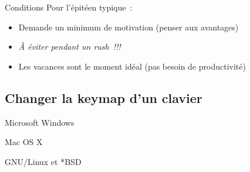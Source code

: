 \begin{frame}{Conditions}
    Pour l’épitéen typique~:
    \begin{itemize}
        \item Demande un minimum de motivation (penser aux avantages) \pause

        \item \emph{À éviter pendant un rush~!!!} \pause

        \item Les vacances sont le moment idéal (pas besoin de productivité)
    \end{itemize}
\end{frame}



\subsection{Changer la keymap d’un clavier}

\begin{frame}{Microsoft Windows}
\end{frame}

\begin{frame}{Mac OS X}
\end{frame}

\begin{frame}{GNU/Linux et *BSD}
\end{frame}
